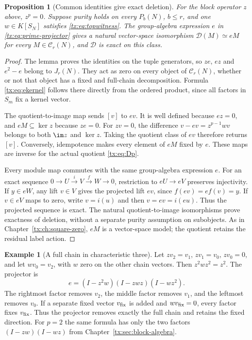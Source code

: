 \documentclass[11pt,a4paper,oneside,openany]{book}
\newtheorem{proposition}[theorem]{Proposition}
\theoremstyle{definition}\newtheorem{definition}[theorem]{Definition}
\newtheorem{example}[theorem]{Example}
\theoremstyle{remark}\newtheorem{remark}[theorem]{Remark}
\newcommand{\D}{\mathcal D}\newcommand{\Del}{\mathcal D}\newcommand{\Lift}{\mathsf L}
\numberwithin{equation}{chapter}
\begin{document}
\begin{proposition}[Common identities give exact deletion]\label{tx:prop:prime-exactness}
For the block operator $z$ above, $z^p=0$. Suppose purity holds on
every $P_b(N)$, $b\le r$, and one
$w\in K[S_N]$ satisfies \eqref{tx:eq:topwitness}. The group-algebra
expression $e$ in \eqref{tx:eq:prime-projector} gives a natural
vector-space isomorphism $\D(M)\simeq eM$ for every
$M\in\mathcal C_r(N)$, and $\D$ is exact on this class.
\end{proposition}
\begin{proof}
The lemma proves the identities on the tuple generators, so $ze$, $ez$
and $e^2-e$ belong to $J_r(N)$. They act as zero on every object of
$\mathcal C_r(N)$, whether or not that object has a fixed and full-chain
decomposition. Formula \eqref{tx:eq:ekernel} follows there directly from
the ordered product, since all factors in $S_m$ fix a kernel vector.

The quotient-to-image map sends $[v]$ to $ev$. It is well defined
because $ez=0$, and $eM\subseteq\ker z$ because $ze=0$.
For $zv=0$, the difference $v-ev=z^{p-1}wv$ belongs to both
$\im z$ and $\ker z$. Taking the quotient class of $ev$ therefore
returns $[v]$. Conversely, idempotence makes every element of $eM$
fixed by $e$. These maps are inverse for the actual quotient
\eqref{tx:eq:Dp}.

Every module map commutes with the same group-algebra expression $e$.
For an exact sequence $0\to U\xrightarrow{i}V\xrightarrow{f}W\to0$,
restriction to $eU\to eV$ preserves injectivity. If $y\in eW$, any
lift $v\in V$ gives the projected lift $ev$, since $f(ev)=ef(v)=y$.
If $v\in eV$ maps to zero, write $v=i(u)$ and then
$v=ev=i(eu)$. Thus the projected sequence is exact. The natural
quotient-to-image isomorphisms prove exactness of deletion, without a
separate purity assumption on subobjects. As in
Chapter~\ref{tx:ch:square-zero}, $eM$ is a vector-space model;
the quotient retains the residual label action.
\end{proof}

\begin{example}[A full chain in characteristic three]
Let $zv_2=v_1$, $zv_1=v_0$, $zv_0=0$, and let $wv_0=v_2$, with $w$ zero on the other chain vectors. Then $z^2wz^2=z^2$. The projector is
\[e=(I-z^2w)(I-zwz)(I-wz^2).
\]
The rightmost factor removes $v_2$, the middle factor removes $v_1$, and the leftmost removes $v_0$. If a separate fixed vector $v_{\rm fix}$ is added and $wv_{\rm fix}=0$, every factor fixes $v_{\rm fix}$. Thus the projector removes exactly the full chain and retains the fixed direction. For $p=2$ the same formula has only the two factors $(I-zw)(I-wz)$ from Chapter~\ref{tx:sec:block-algebra}.
\end{example}
\end{document}
